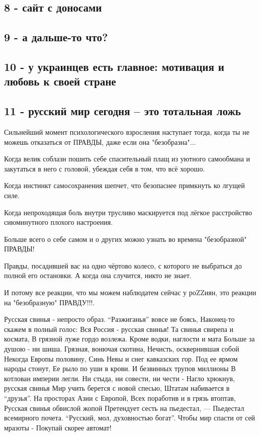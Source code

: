 \subsection{8 - сайт с доносами}

\subsection{9 - а дальше-то что?}

\subsection{10 - у украинцев есть главное: мотивация и любовь к своей стране}

\subsection{11 - русский мир сегодня – это тотальная ложь}

Сильнейший момент психологического взросления наступает тогда, когда ты не
можешь отказаться от ПРАВДЫ, даже если она "безобразна"...

Когда велик соблазн пошить себе спасительный плащ из уютного самообмана и
закутаться в него с головой, убеждая себя в том, что всё хорошо.

Когда инстинкт самосохранения шепчет, что безопаснее примкнуть ко лгущей силе.

Когда непроходящая боль внутри трусливо маскируется под лёгкое расстройство
сиюминутного плохого настроения.

Больше всего о себе самом и о других можно узнать во времена "безобразной"
ПРАВДЫ!

Правды, посадившей вас на одно чёртово колесо, с которого не выбраться до
полной его остановки. А когда она случится, никто не знает.

И потому все реакции, что мы можем наблюдатем сейчас у роZZиян, это реакции на
"безобразную" ПРАВДУ!!!.

Русская свинья - непросто образ.
“Разжиганья” вовсе не боясь,
Наконец-то скажем в полный голос:
Вся Россия - русская свинья!
Та свинья свирепа и космата,
В грязной луже гордо возлежа.
Кроме водки, наглости и мата
Больше за душою - ни шиша.
Грязная, вонючая скотина,
Нечисть, осквернившая собой
Некогда Европы половину,
Синь Невы и снег кавказских гор.
Под ее ярмом народы стонут,
Ее рыло по уши в крови.
И безвинных трупов миллионы
В котлован империи легли.
Ни стыда, ни совести, ни чести -
Нагло хрюкнув, русская свинья
Мир учить берется с новой спесью,
Штатам набивается в “друзья”.
На просторах Азии с Европой,
Всех поработив и в грязь втоптав,
Русская свинья обвислой жопой
Претендует сесть на пьедестал, ––
Пьедестал всемирного почета.
“Русский, мол, духовностью богат”.
Чтобы мир спасти от сей мразоты -
Покупай скорее автомат!

